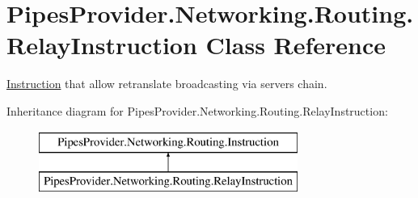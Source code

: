 \hypertarget{class_pipes_provider_1_1_networking_1_1_routing_1_1_relay_instruction}{}\section{Pipes\+Provider.\+Networking.\+Routing.\+Relay\+Instruction Class Reference}
\label{class_pipes_provider_1_1_networking_1_1_routing_1_1_relay_instruction}


\mbox{\hyperlink{class_pipes_provider_1_1_networking_1_1_routing_1_1_instruction}{Instruction}} that allow retranslate broadcasting via servers chain.  


Inheritance diagram for Pipes\+Provider.\+Networking.\+Routing.\+Relay\+Instruction\+:\begin{figure}[H]
\begin{center}
\leavevmode
\includegraphics[height=2.000000cm]{de/d56/class_pipes_provider_1_1_networking_1_1_routing_1_1_relay_instruction}
\end{center}
\end{figure}
